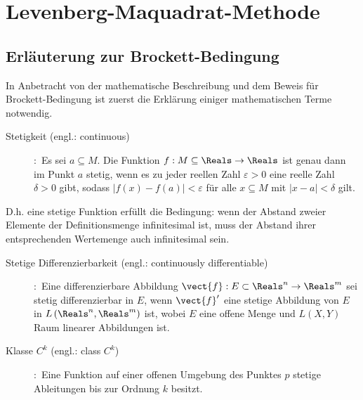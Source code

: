 \ifpdf
\graphicspath{{bild/}}
\else
\graphicspath{%
	{bild/}}
\fi


\chapter{Levenberg-Maquadrat-Methode}
\label{Levenberg-Maquadrat-Methode}
\section{Erläuterung zur Brockett-Bedingung}
\label{Erläuterung zur Brockett-Bedingung}
In Anbetracht von der mathematische Beschreibung und dem Beweis für Brockett-Bedingung ist zuerst die Erklärung einiger mathematischen Terme notwendig.    
\begin{description} 
\item[Stetigkeit (engl.: continuous)]
\cite[S.250]{grosche2003teubner}:~Es sei $a\subseteq M$. Die Funktion $f:M\subseteq\Reals\to\Reals$ ist genau dann im Punkt $a$ stetig, wenn es zu jeder reellen Zahl $\varepsilon>0$ eine reelle Zahl $\delta>0$ gibt, sodass
$\left | f\left ( x \right )-f\left ( a \right ) \right |< \varepsilon$ für alle $x\subseteq M$ mit $\left | x-a \right |< \delta $ gilt.  
\end{description}
\vspace{-0.8em}
D.h. eine stetige Funktion erfüllt die Bedingung: wenn der Abstand zweier Elemente der Definitionsmenge infinitesimal ist, muss der Abstand ihrer entsprechenden Wertemenge auch infinitesimal sein.
\begin{description}
\item[Stetige Differenzierbarkeit (engl.: continuously differentiable)]
\cite[S.256]{rudin2009analysis}:~Eine differenzierbare Abbildung $\vect{f}:E\subset\Reals^{n}\to \Reals^{m}$ sei stetig differenzierbar in $E$, wenn ${\vect{f}}'$ eine stetige Abbildung von $E$ in $L\left ( \Reals^{n},\Reals^{m} \right )$ ist, wobei $E$ eine offene Menge und $L\left ( X,Y \right )$ Raum linearer Abbildungen ist.
\item[Klasse $C^{k}$ (engl.: class $C^{k}$)]
\cite[S.265]{grosche2003teubner}:~Eine Funktion auf einer offenen Umgebung des Punktes $p$ stetige Ableitungen bis zur Ordnung $k$ besitzt.
\end{description}
